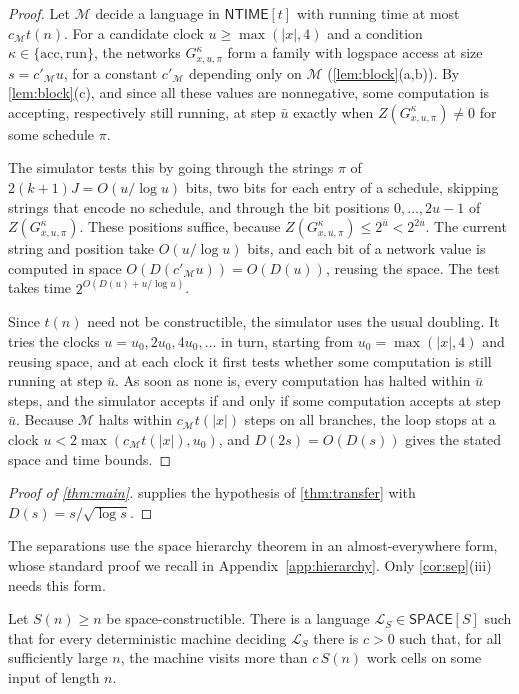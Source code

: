 \documentclass[11pt]{article}
\theoremstyle{definition}
\theoremstyle{definition}
\theoremstyle{remark}
\newcommand{\NTIME}{\mathsf{NTIME}}
\newcommand{\SPACE}{\mathsf{SPACE}}
\newcommand{\acc}{\mathrm{acc}}
\newcommand{\run}{\mathrm{run}}
\begin{document}
\begin{proof}
Let $\mathcal M$ decide a language in $\NTIME[t]$ with running time at most $c_{\mathcal M}t(n)$. For a candidate clock $u\ge\max(|x|,4)$ and a condition $\kappa\in\{\acc,\run\}$, the networks $G^\kappa_{x,u,\pi}$ form a family with logspace access at size $s=c'_{\mathcal M}u$, for a constant $c'_{\mathcal M}$ depending only on $\mathcal M$ (\cref{lem:block}(a,b)). By \cref{lem:block}(c), and since all these values are nonnegative, some computation is accepting, respectively still running, at step $\bar u$ exactly when $Z(G^\kappa_{x,u,\pi})\ne0$ for some schedule $\pi$.

The simulator tests this by going through the strings $\pi$ of $2(k+1)J=O(u/\log u)$ bits, two bits for each entry of a schedule, skipping strings that encode no schedule, and through the bit positions $0,\dots,2u-1$ of $Z(G^\kappa_{x,u,\pi})$. These positions suffice, because $Z(G^\kappa_{x,u,\pi})\le2^{\bar u}<2^{2u}$. The current string and position take $O(u/\log u)$ bits, and each bit of a network value is computed in space $O(D(c'_{\mathcal M}u))=O(D(u))$, reusing the space. The test takes time $2^{O(D(u)+u/\log u)}$.

Since $t(n)$ need not be constructible, the simulator uses the usual doubling. It tries the clocks $u=u_0,2u_0,4u_0,\dots$ in turn, starting from $u_0=\max(|x|,4)$ and reusing space, and at each clock it first tests whether some computation is still running at step $\bar u$. As soon as none is, every computation has halted within $\bar u$ steps, and the simulator accepts if and only if some computation accepts at step $\bar u$. Because $\mathcal M$ halts within $c_{\mathcal M}t(|x|)$ steps on all branches, the loop stops at a clock $u<2\max(c_{\mathcal M}t(|x|),u_0)$, and $D(2s)=O(D(s))$ gives the stated space and time bounds.
\end{proof}

\begin{proof}[Proof of \cref{thm:main}]
 supplies the hypothesis of \cref{thm:transfer} with $D(s)=s/\sqrt{\log s}$.
\end{proof}

The separations use the space hierarchy theorem in an almost-everywhere form, whose standard proof we recall in Appendix~\ref{app:hierarchy}. Only \cref{cor:sep}(iii) needs this form.

\begin{lemma}\label{lem:hierarchy}
Let $S(n)\ge n$ be space-constructible. There is a language $\mathcal L_S\in\SPACE[S]$ such that for every deterministic machine deciding $\mathcal L_S$ there is $c>0$ such that, for all sufficiently large $n$, the machine visits more than $c\,S(n)$ work cells on some input of length $n$.
\end{lemma}
\end{document}
